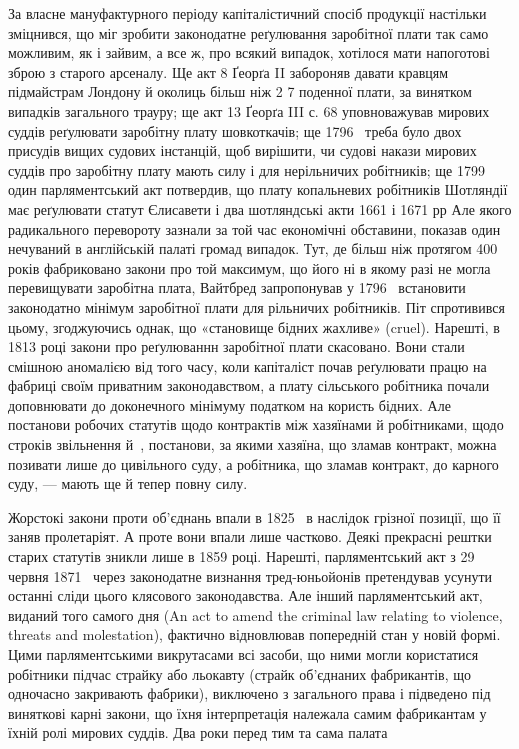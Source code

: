 За власне мануфактурного періоду капіталістичний спосіб
продукції настільки зміцнився, що міг зробити законодатне
реґулювання заробітної плати так само можливим, як і зайвим,
а все ж, про всякий випадок, хотілося мати напоготові зброю
з старого арсеналу. Ще акт 8 Ґеорґа II забороняв давати кравцям
підмайстрам Лондону й околиць більш ніж 2 7
поденної плати, за винятком випадків загального трауру; ще
\parbreak{}
\parcont{}
акт 13 Ґеорґа III с. 68 уповноважував мирових суддів реґулювати
заробітну плату шовкоткачів; ще 1796~ треба було двох
присудів вищих судових інстанцій, щоб вирішити, чи судові
накази мирових суддів про заробітну плату мають силу і для
нерільничих робітників; ще 1799~ один парляментський акт
потвердив, що плату копальневих робітників Шотляндії має
реґулювати статут Єлисавети і два шотляндські акти 1661 і 1671 рр
Але якого радикального перевороту зазнали за той час економічні
обставини, показав один нечуваний в англійській палаті
громад випадок. Тут, де більш ніж протягом 400 років фабриковано
закони про той максимум, що його ні в якому разі не
могла перевищувати заробітна плата, Вайтбред запропонував
у 1796~ встановити законодатно мінімум заробітної плати для
рільничих робітників. Піт спротивився цьому, згоджуючись
однак, що «становище бідних жахливе» (cruel). Нарешті, в
1813 році закони про реґулюваннн заробітної плати скасовано.
Вони стали смішною аномалією від того часу, коли капіталіст
почав реґулювати працю на фабриці своїм приватним законодавством,
а плату сільського робітника почали доповнювати до доконечного
мінімуму податком на користь бідних. Але постанови
робочих статутів щодо контрактів між хазяїнами й робітниками,
щодо строків звільнення й~, постанови, за якими хазяїна,
що зламав контракт, можна позивати лише до цивільного суду,
а робітника, що зламав контракт, до карного суду, — мають ще
й тепер повну силу.

Жорстокі закони проти об’єднань впали в 1825~ в наслідок
грізної позиції, що її заняв пролетаріят. А проте вони впали
лише частково. Деякі прекрасні рештки старих статутів зникли
лише в 1859 році. Нарешті, парляментський акт з 29 червня
1871~ через законодатне визнання тред-юньойонів претендував
усунути останні сліди цього клясового законодавства. Але
інший парляментський акт, виданий того самого дня (An act
to amend the criminal law relating to violence, threats and molestation),
фактично відновлював попередній стан у новій формі.
Цими парляментськими викрутасами всі засоби, що ними могли
користатися робітники підчас страйку або льокавту (страйк
об’єднаних фабрикантів, що одночасно закривають фабрики),
виключено з загального права і підведено під виняткові карні
закони, що їхня інтерпретація належала самим фабрикантам
у їхній ролі мирових суддів. Два роки перед тим та сама палата
\parbreak{}  %
